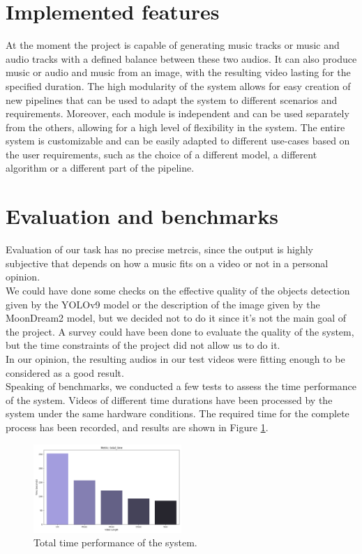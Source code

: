 \documentclass[conference]{IEEEtran}
\begin{document}
\section{Implemented features}
At the moment the project is capable of generating music tracks or music and audio tracks with a defined balance between these two audios. It can also produce music or audio and music from an image, with the resulting video lasting for the specified duration. 
The high modularity of the system allows for easy creation of new pipelines that can be used to adapt the system to different scenarios and requirements. Moreover, each 
module is independent and can be used separately from the others, allowing for a high level of flexibility in the system.  
The entire system is customizable and can be easily adapted to different use-cases based on the user requirements, such as the choice of a different model, a different algorithm or a different part of the pipeline.
\section{Evaluation and benchmarks}
Evaluation of our task has no precise metrcis, since the output is highly subjective that depends on how a music fits on a video or not in a personal opinion.\\ We could have done some 
checks on the effective quality of the objects detection given by the YOLOv9 model or the description of the image given by the MoonDream2 model, but we decided not to do it since it's not the main goal of the project. A survey could have been done to evaluate the quality of the system, but the time constraints of the project did not allow us to do it.\\
In our opinion, the resulting audios in our test videos were fitting enough to be considered as a good result.\\
Speaking of benchmarks, we conducted a few tests to assess the time performance of the system. Videos of different time durations have been processed by the system under the same hardware conditions. The required time for the complete process has been recorded, and results are shown in Figure \ref*{time_performance}.

\begin{figure}[H]
    \centerline{\includegraphics[width=0.5\textwidth]{../Presentation/graphs/total_time.png}}
    \caption{Total time performance of the system.}
    \label{time_performance}
\end{figure}
\end{document}
